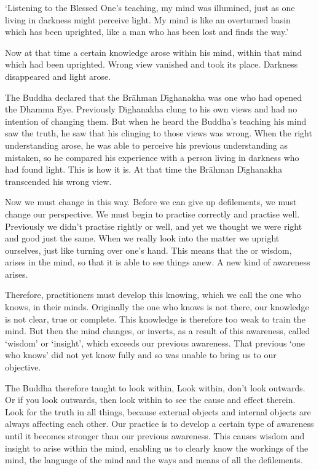 `Listening to the Blessed One's teaching, my mind was illumined, just as one living in darkness might perceive light. My mind is like an overturned basin which has been uprighted, like a man who has been lost and finds the way.'

Now at that time a certain knowledge arose within his mind, within that mind which had been uprighted. Wrong view vanished and  took its place. Darkness disappeared and light arose.

The Buddha declared that the Br\=ahman D\={\i}ghanakha was one who had opened the Dhamma Eye. Previously D\={\i}ghanakha clung to his own views and had no intention of changing them. But when he heard the Buddha's teaching his mind saw the truth, he saw that his clinging to those views was wrong. When the right understanding arose, he was able to perceive his previous understanding as mistaken, so he compared his experience with a person living in darkness who had found light. This is how it is. At that time the Br\=ahman D\={\i}ghanakha transcended his wrong view.

Now we must change in this way. Before we can give up defilements, we must change our perspective. We must begin to practise correctly and practise well. Previously we didn't practise rightly or well, and yet we thought we were right and good just the same. When we really look into the matter we upright ourselves, just like turning over one's hand. This means that the  or wisdom, arises in the mind, so that it is able to see things anew. A new kind of awareness arises.

Therefore, practitioners must develop this knowing, which we call  the one who knows, in their minds. Originally the one who knows is not there, our knowledge is not clear, true or complete. This knowledge is therefore too weak to train the mind. But then the mind changes, or inverts, as a result of this awareness, called `wisdom' or `insight', which exceeds our previous awareness. That previous `one who knows' did not yet know fully and so was unable to bring us to our objective.

The Buddha therefore taught to look within,  Look within, don't look outwards. Or if you look outwards, then look within to see the cause and effect therein. Look for the truth in all things, because external objects and internal objects are always affecting each other. Our practice is to develop a certain type of awareness until it becomes stronger than our previous awareness. This causes wisdom and insight to arise within the mind, enabling us to clearly know the workings of the mind, the language of the mind and the ways and means of all the defilements.

